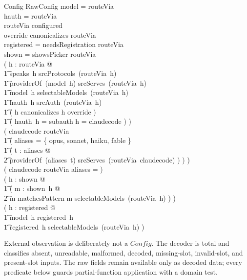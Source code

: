 \documentclass{article}
\begin{document}
\begin{schema}{Config}
	RawConfig
	\where
	\dom model = \dom routeVia \\
	\dom hauth = \dom routeVia \\
	\ran routeVia \subseteq configured \\
	override \subseteq canonicalizes \cap \dom routeVia \\
	\dom registered = needsRegistration \cap \dom routeVia \\
	\dom shown = showsPicker \cap \dom routeVia \\
	( \forall h : \dom routeVia @ \\
	\t1 speaks~h \in srcProtocols~(routeVia~h) \land \\
	\t1 providerOf~(model~h) \in srcServes~(routeVia~h) \land \\
	\t1 model~h \in selectableModels~(routeVia~h) \land \\
	\t1 hauth~h \in srcAuth~(routeVia~h) \land \\
	\t1 ( h \in canonicalizes \implies h \in override ) \land \\
	\t1 ( hauth~h = subauth \implies h = claudecode ) ) \\
	( claudecode \in \dom routeVia \implies \\
	\t1 ( \dom aliases = \{ opus, sonnet, haiku, fable \} \land \\
	\t1   ( \forall t : \dom aliases @ \\
	\t2     providerOf~(aliases~t) \in srcServes~(routeVia~claudecode) ) ) ) \\
	( claudecode \notin \dom routeVia \implies aliases = \emptyset ) \\
	( \forall h : \dom shown @ \\
	\t1 ( \forall m : shown~h @ \\
	\t2 m \in matchesPattern \land m \in selectableModels~(routeVia~h) ) ) \\
	( \forall h : \dom registered @ \\
	\t1 model~h \in registered~h \land \\
	\t1 registered~h \subseteq selectableModels~(routeVia~h) )
\end{schema}

External observation is deliberately not a $Config$.  The decoder is total and
classifies absent, unreadable, malformed, decoded, missing-slot, invalid-slot,
and present-slot inputs.  The raw fields remain available only as decoded data;
every predicate below guards partial-function application with a domain test.
\end{document}
